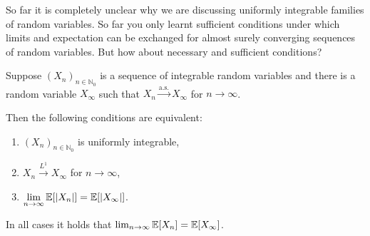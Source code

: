 So far it is completely unclear why we are discussing uniformly integrable families of random variables. So far you only learnt sufficient conditions under which limits and expectation can be exchanged for almost surely converging sequences of random variables. But how about necessary and sufficient conditions?
\begin{lsatzwichtig}
\begin{theorem}\label{generalized_DCT}
	Suppose $(X_n)_{n\in\mathbb{N}_0}$ is a sequence of integrable random variables and there is a random variable $X_\infty$ such that $X_n \overset{\text{a.s.}}{\longrightarrow} X_{\infty}$ for $n\to\infty$.\smallskip
	
	Then the following conditions are equivalent:
	\begin{enumerate}[label=(\roman*)]
		\item
			$(X_n)_{n\in\mathbb{N}_0}$ is uniformly integrable,
		\item
			$X_n \overset{L^1}{\longrightarrow}X_{\infty}$ for $n \to \infty$,
		\item
			$\lim\limits_{n\to\infty}\mathbb{E}[\lvert X_n\rvert] = \mathbb{E}[\lvert X_{\infty}\rvert]$.
	\end{enumerate}
	In all cases it holds that $\lim_{n\to\infty}\mathbb{E}[ X_n] = \mathbb{E}[ X_{\infty}]$.
\end{theorem}
\end{lsatzwichtig}
